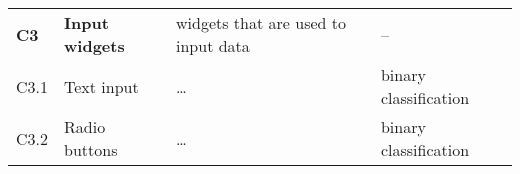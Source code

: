 \begin{table}[]
\begin{tabular}{@{}llll@{}}
        \textbf{C3}     & \textbf{Input widgets}          & widgets that are used to input data                     & –                             \\
        C3.1            & Text input                      & \ldots                                                  & binary classification         \\
        C3.2            & Radio buttons                   & \ldots                                                  & binary classification         \\ \bottomrule
    \end{tabular}
\end{table}
